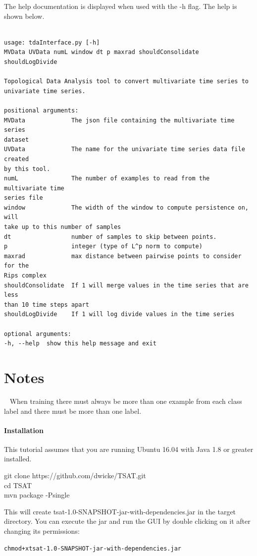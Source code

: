 \documentclass[titlepage, letterpaper, 12pt]{article}
\newenvironment{allintypewriter}{\ttfamily}{\par}
\newcommand\TSATVERSION{1.0}
\begin{document}
The help documentation is displayed when used with the -h flag.  The help is shown below.
\begin{verbatim}

usage: tdaInterface.py [-h]
MVData UVData numL window dt p maxrad shouldConsolidate
shouldLogDivide

Topological Data Analysis tool to convert multivariate time series to
univariate time series.

positional arguments:
MVData             The json file containing the multivariate time series
dataset
UVData             The name for the univariate time series data file created
by this tool.
numL               The number of examples to read from the multivariate time
series file
window             The width of the window to compute persistence on, will
take up to this number of samples
dt                 number of samples to skip between points.
p                  integer (type of L^p norm to compute)
maxrad             max distance between pairwise points to consider for the
Rips complex
shouldConsolidate  If 1 will merge values in the time series that are less
than 10 time steps apart
shouldLogDivide    If 1 will log divide values in the time series

optional arguments:
-h, --help  show this help message and exit

\end{verbatim}


\section{Notes}
~\label{Notes}
When training there must always be more than one example from each class label and there must be more than one label.  

\paragraph{Installation}

This tutorial assumes that you are running Ubuntu 16.04 with Java 1.8 or greater installed.

\begin{allintypewriter}
	\noindent git clone https://github.com/dwicke/TSAT.git\\
	cd TSAT\\
	mvn package -Psingle\\
\end{allintypewriter}
This will create tsat-{\TSATVERSION}-SNAPSHOT-jar-with-dependencies.jar in the target directory.  You can execute the jar and run the GUI by double clicking on it after changing its permissions:
\begin{alltt}
chmod +x tsat-{\TSATVERSION}-SNAPSHOT-jar-with-dependencies.jar
\end{alltt}  
\end{document}
